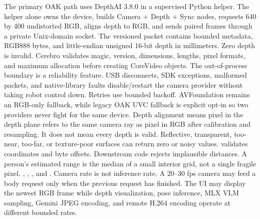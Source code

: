 {}The primary OAK path uses DepthAI 3.8.0 in a supervised Python helper. The helper alone owns the device, builds Camera + Depth + Sync nodes, requests 640 by 400 undistorted RGB, aligns depth to RGB, and sends paired frames through a private Unix-domain socket.\markdownRendererParagraphSeparator
{}The versioned  packet contains bounded metadata, RGB888 bytes, and little-endian unsigned 16-bit depth in millimeters. Zero depth is invalid. Cerebro validates magic, version, dimensions, lengths, pixel formats, and maximum allocation before creating CoreVideo objects.\markdownRendererParagraphSeparator
{}The out-of-process boundary is a reliability feature. USB disconnects, SDK exceptions, malformed packets, and native-library faults disable/restart the camera provider without taking robot control down. Retries use bounded backoff. AVFoundation remains an RGB-only fallback, while legacy OAK UVC fallback is explicit opt-in so two providers never fight for the same device.\markdownRendererInterblockSeparator
{}\markdownRendererSectionBegin
{}\markdownRendererInterblockSeparator
{}Depth alignment means pixel  in the depth plane refers to the same camera ray as pixel  in RGB after calibration and resampling. It does not mean every depth is valid. Reflective, transparent, too-near, too-far, or texture-poor surfaces can return zero or noisy values.\markdownRendererParagraphSeparator
{} validates coordinates and byte offsets. Downstream code rejects implausible distances. A person's estimated range is the median of a small interior grid, not a single fragile pixel.\markdownRendererInterblockSeparator
{}
\markdownRendererSectionEnd 
\markdownRendererSectionEnd \markdownRendererSectionBegin
{}\markdownRendererInterblockSeparator
{}\markdownRendererBlockQuoteBegin
{} , , , and .\markdownRendererBlockQuoteEnd \markdownRendererInterblockSeparator
{}Camera rate is not inference rate. A 20–30 fps camera may feed a body request only when the previous request has finished. The UI may display the newest RGB frame while depth visualization, pose inference, MLX VLM sampling, Gemini JPEG encoding, and remote H.264 encoding operate at different bounded rates.\markdownRendererParagraphSeparator
